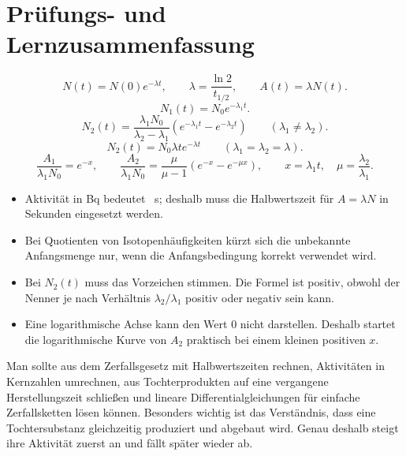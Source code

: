 \documentclass[11pt,a4paper]{scrartcl}
\newcommand{\paren}[1]{\left( #1 \right)}
\theoremstyle{definition}
\theoremstyle{plain}
\theoremstyle{remark}
\begin{document}
\newpage

\section{Prüfungs- und Lernzusammenfassung}

\begin{formulabox}[title=Wichtige Formeln]
\[
    N(t)=N(0)e^{-\lambda t},
    \qquad
    \lambda=\frac{\ln 2}{t_{1/2}},
    \qquad
    A(t)=\lambda N(t).
\]
\[
    N_1(t)=N_0e^{-\lambda_1t}.
\]
\[
    N_2(t)=\frac{\lambda_1N_0}{\lambda_2-\lambda_1}
    \paren{e^{-\lambda_1t}-e^{-\lambda_2t} }
    \qquad (\lambda_1\neq\lambda_2).
\]
\[
    N_2(t)=N_0\lambda t e^{-\lambda t}
    \qquad (\lambda_1=\lambda_2=\lambda).
\]
\[
    \frac{A_1}{\lambda_1N_0}=e^{-x},
    \qquad
    \frac{A_2}{\lambda_1N_0}=\frac{\mu}{\mu-1}\paren{e^{-x}-e^{-\mu x}},
    \qquad
    x=\lambda_1t,
    \quad
    \mu=\frac{\lambda_2}{\lambda_1}.
\]
\end{formulabox}

\begin{warningbox}[title=Typische Fehler]
\begin{itemize}
    \item Aktivität in \si{\becquerel} bedeutet \si{\per\second}; deshalb muss die Halbwertszeit für $A=\lambda N$ in Sekunden eingesetzt werden.
    \item Bei Quotienten von Isotopenhäufigkeiten kürzt sich die unbekannte Anfangsmenge nur, wenn die Anfangsbedingung korrekt verwendet wird.
    \item Bei $N_2(t)$ muss das Vorzeichen stimmen. Die Formel ist positiv, obwohl der Nenner je nach Verhältnis $\lambda_2/\lambda_1$ positiv oder negativ sein kann.
    \item Eine logarithmische Achse kann den Wert $0$ nicht darstellen. Deshalb startet die logarithmische Kurve von $A_2$ praktisch bei einem kleinen positiven $x$.
\end{itemize}
\end{warningbox}

\begin{summarybox}[title=Was man für die Prüfung können sollte]
Man sollte aus dem Zerfallsgesetz mit Halbwertszeiten rechnen, Aktivitäten in Kernzahlen umrechnen, aus Tochterprodukten auf eine vergangene Herstellungszeit schließen und lineare Differentialgleichungen für einfache Zerfallsketten lösen können. Besonders wichtig ist das Verständnis, dass eine Tochtersubstanz gleichzeitig produziert und abgebaut wird. Genau deshalb steigt ihre Aktivität zuerst an und fällt später wieder ab.
\end{summarybox}
\end{document}
